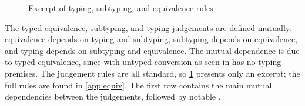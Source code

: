 \documentclass[acmsmall,review,anonymous]{acmart}\settopmatter{printfolios=true,printccs=false,printacmref=false}
\begin{document}
\begin{figure}[h]
\centering
{}
\caption{Excerpt of typing, subtyping, and equivalence rules}
\label{fig:equiv-sub-type}
\end{figure}

The typed equivalence, subtyping, and typing judgements are defined mutually:
equivalence depends on typing and subtyping,
subtyping depends on equivalence,
and typing depends on subtyping and equivalence.
The mutual dependence is due to typed equivalence,
since with untyped conversion as seen in \lang has no typing premises.
The judgement rules are all standard,
so \cref{fig:equiv-sub-type} presents only an excerpt;
the full rules are found in \cref{app:equiv}.
The first row contains the main mutual dependencies between the judgements,
followed by notable .
\end{document}
